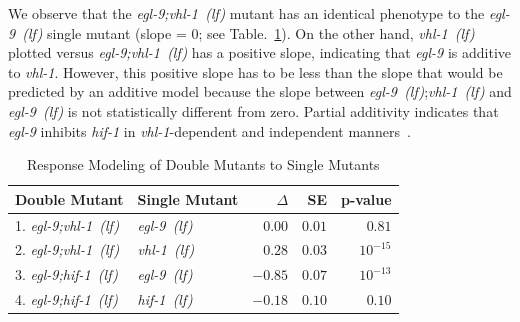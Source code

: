 \documentclass[9pt,twocolumn,twoside]{pnas-new}
\newcommand{\gene}[1]{\emph{#1}}
\newcommand{\egl}{\emph{egl-9~(lf)}}
\newcommand{\vhl}{\emph{vhl-1~(lf)}}
\newcommand{\eglvhl}{\emph{egl-9;vhl-1~(lf)}}
\newcommand{\eglhif}{\emph{egl-9;hif-1~(lf)}}
\newcommand{\hif}{\emph{hif-1~(lf)}}
\begin{document}
We observe that the \eglvhl{} mutant has an identical phenotype to the
\egl{} single mutant (slope = 0; see Table.~\ref{tab:double_mutant_comparison}).
On the other hand, \vhl{} plotted versus \eglvhl{} has a positive slope,
indicating that \gene{egl-9} is additive to \gene{vhl-1}. However, this positive
slope has to be less than the slope that would be predicted by an additive model
because the slope between \egl{};\vhl{} and \egl{} is not statistically different
from zero. Partial additivity indicates that \gene{egl-9} inhibits \gene{hif-1}
in \gene{vhl-1}-dependent and independent manners~\cite{Shao2009}.

\begin{table}%
{\centering
\caption{Response Modeling of Double Mutants to Single Mutants}
\begin{tabular}{llrrr}
Double Mutant & Single Mutant & $\Delta$ & SE & p-value\\
\midrule
1. \eglvhl{} & \egl{} & $0.00$ & $0.01$ & $0.81$\\
2. \eglvhl{} & \vhl{} & $0.28$ & $0.03$ & $10^{-15}$\\
3. \eglhif{} & \egl{} & $-0.85$ & $0.07$ & $10^{-13}$\\
4. \eglhif{} & \hif{} & $-0.18$ & $0.10$ & $0.10$\\
\bottomrule
\end{tabular}
\par
\label{tab:double_mutant_comparison}
}
\end{table}
\end{document}
